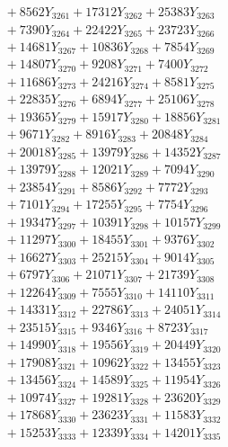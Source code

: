 \documentclass[a4paper,10pt]{article}
\begin{document}
{\begin{align}
&\;  + 8562 Y_{3261} + 17312 Y_{3262} + 25383 Y_{3263} \\[0.3ex]
&\;  + 7390 Y_{3264} + 22422 Y_{3265} + 23723 Y_{3266} \\[0.3ex]
&\;  + 14681 Y_{3267} + 10836 Y_{3268} + 7854 Y_{3269} \\[0.5ex]\allowbreak
&\;  + 14807 Y_{3270} + 9208 Y_{3271} + 7400 Y_{3272} \\[0.3ex]
&\;  + 11686 Y_{3273} + 24216 Y_{3274} + 8581 Y_{3275} \\[0.3ex]
&\;  + 22835 Y_{3276} + 6894 Y_{3277} + 25106 Y_{3278} \\[0.3ex]
&\;  + 19365 Y_{3279} + 15917 Y_{3280} + 18856 Y_{3281} \\[0.3ex]
&\;  + 9671 Y_{3282} + 8916 Y_{3283} + 20848 Y_{3284} \\[0.3ex]
&\;  + 20018 Y_{3285} + 13979 Y_{3286} + 14352 Y_{3287} \\[0.3ex]
&\;  + 13979 Y_{3288} + 12021 Y_{3289} + 7094 Y_{3290} \\[0.3ex]
&\;  + 23854 Y_{3291} + 8586 Y_{3292} + 7772 Y_{3293} \\[0.3ex]
&\;  + 7101 Y_{3294} + 17255 Y_{3295} + 7754 Y_{3296} \\[0.3ex]
&\;  + 19347 Y_{3297} + 10391 Y_{3298} + 10157 Y_{3299} \\[0.5ex]\allowbreak
&\;  + 11297 Y_{3300} + 18455 Y_{3301} + 9376 Y_{3302} \\[0.3ex]
&\;  + 16627 Y_{3303} + 25215 Y_{3304} + 9014 Y_{3305} \\[0.3ex]
&\;  + 6797 Y_{3306} + 21071 Y_{3307} + 21739 Y_{3308} \\[0.3ex]
&\;  + 12264 Y_{3309} + 7555 Y_{3310} + 14110 Y_{3311} \\[0.3ex]
&\;  + 14331 Y_{3312} + 22786 Y_{3313} + 24051 Y_{3314} \\[0.3ex]
&\;  + 23515 Y_{3315} + 9346 Y_{3316} + 8723 Y_{3317} \\[0.3ex]
&\;  + 14990 Y_{3318} + 19556 Y_{3319} + 20449 Y_{3320} \\[0.3ex]
&\;  + 17908 Y_{3321} + 10962 Y_{3322} + 13455 Y_{3323} \\[0.3ex]
&\;  + 13456 Y_{3324} + 14589 Y_{3325} + 11954 Y_{3326} \\[0.3ex]
&\;  + 10974 Y_{3327} + 19281 Y_{3328} + 23620 Y_{3329} \\[0.5ex]\allowbreak
&\;  + 17868 Y_{3330} + 23623 Y_{3331} + 11583 Y_{3332} \\[0.3ex]
&\;  + 15253 Y_{3333} + 12339 Y_{3334} + 14201 Y_{3335} \\[0.3ex]

\end{align}}
\end{document}

